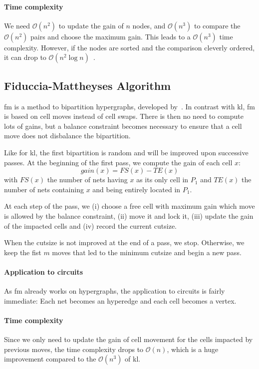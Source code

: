 \documentclass[11pt,a4paper]{report} %
\theoremstyle{customdef}
\begin{document}
\paragraph{Time complexity}
We need $\mathcal{O}(n^2)$ to update the gain of $n$ nodes, and $\mathcal{O}(n^3)$ to compare the $\mathcal{O}(n^2)$ pairs and choose the maximum gain.
This leads to a $\mathcal{O}(n^3)$ time complexity.
However, if the nodes are sorted and the comparison cleverly ordered, it can drop to $\mathcal{O}(n^2\log{}n)$~\citep*{Cormen2009, Dutt1993}.







\subsection{Fiduccia-Mattheyses Algorithm}
\gls{fm} is a method to bipartition hypergraphs, developed by~\citet{Fiduccia1982}.
In contrast with \gls{kl}, \gls{fm} is based on cell moves instead of cell swaps.
There is then no need to compute lots of gains, but a balance constraint becomes necessary to ensure that a cell move does not disbalance the bipartition.

Like for \gls{kl}, the first bipartition is random and will be improved upon successive passes.
At the beginning of the first pass, we compute the gain of each cell $x$: \[gain(x) = FS(x) - TE(x)\]
with $FS(x)$ the number of nets having $x$ as its only cell in $P_1$ and $TE(x)$ the number of nets containing $x$ and being entirely located in $P_1$.

At each step of the pass, we (i) choose a free cell with maximum gain which move is allowed by the balance constraint, (ii) move it and lock it, (iii) update the gain of the impacted cells and (iv) record the current cutsize.

When the cutsize is not improved at the end of a pass, we stop. Otherwise, we keep the fist $m$ moves that led to the minimum cutsize and begin a new pass.


\paragraph{Application to circuits}
As \gls{fm} already works on hypergraphs, the application to circuits is fairly immediate: Each net becomes an hyperedge and each cell becomes a vertex.

\paragraph{Time complexity}
Since we only need to update the gain of cell movement for the cells impacted by previous moves, the time complexity drops to $\mathcal{O}(n)$, which is a huge improvement compared to the $\mathcal{O}(n^3)$ of \gls{kl}.
\end{document}
